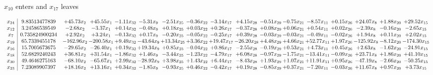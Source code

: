 \documentclass[9pt]{article}
\begin{document}
 $ x_{10} $ enters and $ x_{17} $ leaves 

 \[\begin{array}{c| c c@{\hskip 2pt} c@{\hskip 2pt} c@{\hskip 2pt} c@{\hskip 2pt} c@{\hskip 2pt} c@{\hskip 2pt} c@{\hskip 2pt} c@{\hskip 2pt} c@{\hskip 2pt} c@{\hskip 2pt} c@{\hskip 2pt} c@{\hskip 2pt} c@{\hskip 2pt} c@{\hskip 2pt} c@{\hskip 2pt} }
 x_{24}   &  9.83513477839 & + 45.73 x_{2} & + 45.55 x_{1} & -1.11 x_{32} & -5.31 x_{9} & -2.51 x_{25} & -0.36 x_{22} & -3.14 x_{17} & +  4.15 x_{28} & -0.51 x_{29} & -0.75 x_{21} & -8.57 x_{11} & +  0.15 x_{26} & + 24.07 x_{8} & +  1.88 x_{20} & + 29.52 x_{15}\\
 x_{12}   &  3.24586539549 & -2.68 x_{2} & -3.37 x_{1} & +  0.14 x_{32} & -0.48 x_{9} & +  0.18 x_{25} & +  0.03 x_{22} & +  0.26 x_{17} & -0.37 x_{28} & +  0.08 x_{29} & +  0.06 x_{21} & +  0.54 x_{11} & +  0.02 x_{26} & -2.39 x_{8} & -0.16 x_{20} & -2.65 x_{15}\\
 x_{7}   &  0.735824900234 & +  2.92 x_{2} & +  3.24 x_{1} & -0.13 x_{32} & +  0.17 x_{9} & -0.20 x_{25} & -0.05 x_{22} & -0.25 x_{17} & +  0.39 x_{28} & -0.03 x_{29} & -0.03 x_{21} & -0.49 x_{11} & -0.02 x_{26} & +  1.94 x_{8} & +  0.11 x_{20} & +  2.02 x_{15}\\
 x_{19}   &  65.7339455178 & -162.96 x_{2} & -200.58 x_{1} & +  9.49 x_{32} & -43.64 x_{9} & + 13.34 x_{25} & +  3.36 x_{22} & + 19.47 x_{17} & -26.20 x_{28} & +  4.48 x_{29} & +  4.66 x_{21} & + 52.77 x_{11} & +  1.97 x_{26} & -125.92 x_{8} & -8.12 x_{20} & -174.30 x_{15}\\
 x_{16}   &  15.7005673675 & -29.65 x_{2} & -26.40 x_{1} & +  0.19 x_{32} & + 19.34 x_{9} & +  0.85 x_{25} & -0.04 x_{22} & +  0.86 x_{17} & -2.55 x_{28} & -0.19 x_{29} & +  0.53 x_{21} & +  4.73 x_{11} & +  0.45 x_{26} & +  2.63 x_{8} & -1.62 x_{20} & -24.91 x_{15}\\
 x_{18}   &  52.6829240243 & + 36.81 x_{2} & + 31.54 x_{1} & -1.86 x_{32} & +  1.46 x_{9} & -3.44 x_{25} & -1.23 x_{22} & -4.79 x_{17} & +  6.08 x_{28} & -0.97 x_{29} & -1.75 x_{21} & -13.41 x_{11} & -0.09 x_{26} & + 23.71 x_{8} & +  1.86 x_{20} & + 41.10 x_{15}\\
 x_{30}   &  49.4646275163 & -68.10 x_{2} & -65.67 x_{1} & +  2.99 x_{32} & -28.92 x_{9} & +  3.98 x_{25} & +  1.43 x_{22} & +  6.44 x_{17} & -8.43 x_{28} & +  1.93 x_{29} & +  1.07 x_{21} & + 11.91 x_{11} & +  0.95 x_{26} & -47.19 x_{8} & -2.66 x_{20} & -50.25 x_{15}\\
 x_{23}   &  7.23089907397 & + 18.16 x_{2} & + 13.16 x_{1} & +  0.34 x_{32} & -1.85 x_{9} & -0.93 x_{25} & +  0.46 x_{22} & -0.42 x_{17} & +  0.19 x_{28} & -0.85 x_{29} & +  0.37 x_{21} & -7.20 x_{11} & -0.03 x_{26} & + 11.67 x_{8} & +  0.97 x_{20} & +  3.73 x_{15}\\

\end{array}\]
\end{document}
